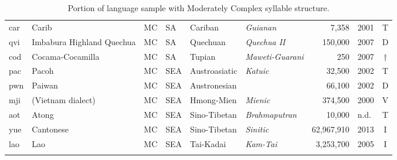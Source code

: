 \begin{table}
\begin{tabularx}{\textwidth}{lQllQQrlc}
 car & {{Carib}} & MC & SA & {Cariban} & {\textit{Guianan}} &  7,358 & 2001 & T\\
 qvi & {{Imbabura Highland Quechua}} & MC & SA & {Quechuan} & {\textit{Quechua II}} &  150,000 & 2007 & D\\
 cod & {{Cocama-Cocamilla}} & MC & SA & {Tupian} & {\textit{Maweti-Guarani}} &  250 & 2007 & †\\
 pac & {{Pacoh}} & MC & SEA  & {Austroasiatic} & {\textit{Katuic}} &  32,500 & 2002 & T\\
 pwn & {{Paiwan}} & MC & SEA  & {Austronesian} &  &  66,100 & 2002 & D\\
 mji & {{ (Vietnam dialect)}} & MC & SEA  & {Hmong-Mien} & {\textit{Mienic}} &  374,500 & 2000 & V\\
 aot & {{Atong}} & MC & SEA  & {Sino-Tibetan} & {\textit{Brahmaputran}} &  10,000 & n.d. & T\\
 yue & {{Cantonese}} & MC & SEA  & {Sino-Tibetan} & {\textit{Sinitic}} &  62,967,910 & 2013 & I\\
 lao & {{Lao}} & MC & SEA  & {Tai-Kadai} & {\textit{Kam-Tai}} &  3,253,700 & 2005 & I\\
\lspbottomrule
\end{tabularx}
\caption{Portion of language sample with Moderately Complex syllable structure.\label{tab:A.2}}
\end{table}


